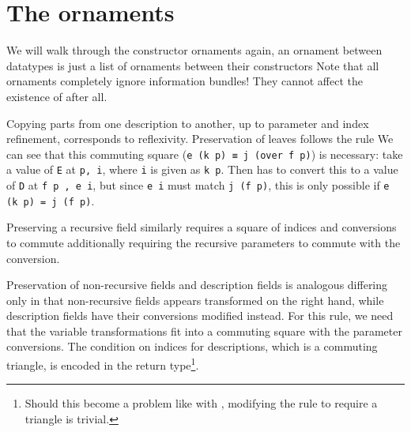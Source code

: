 



\section{The ornaments}


We will walk through the constructor ornaments
again, an ornament between datatypes is just a list of ornaments between their constructors
Note that all ornaments completely ignore information bundles! They cannot affect the existence of  after all.

Copying parts from one description to another, up to parameter and index refinement, corresponds to reflexivity. Preservation of leaves follows the rule
We can see that this commuting square (\texttt{e (k p) ≡ j (over f p)}) is necessary: take a value of \texttt{E} at \texttt{p, i}, where \texttt{i} is given as \texttt{k p}. Then  has to convert this to a value of \texttt{D} at \texttt{f p , e i}, but since \texttt{e i} must match \texttt{j (f p)}, this is only possible if \texttt{e (k p) = j (f p)}.

Preserving a recursive field similarly requires a square of indices and conversions to commute
additionally requiring the recursive parameters to commute with the conversion. 

Preservation of non-recursive fields and description fields is analogous
differing only in that non-recursive fields appears transformed on the right hand, while description fields have their conversions modified instead. For this rule, we need that the variable transformations fit into a commuting square with the parameter conversions. The condition on indices for descriptions, which is a commuting triangle, is encoded in the return type\footnote{Should this become a problem like with , modifying the rule to require a triangle is trivial.}.

